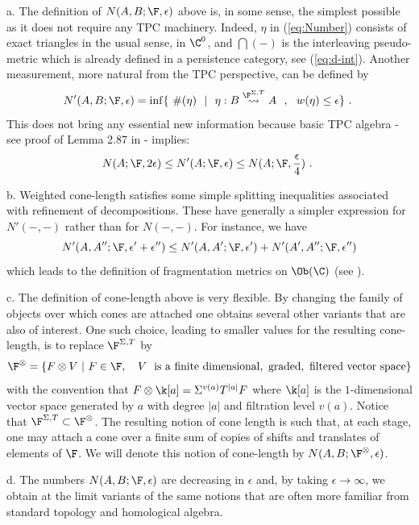\begin{rem}\label{rem:cone-l} a. The definition of
  $N(A,B;\F,\epsilon)$ above is, in some sense, the simplest
  possible as it does not require any TPC machinery. Indeed, $\eta$ in
  (\ref{eq:Number}) consists of exact triangles in the usual sense, in
  $\C^{0}$, and $\dint(-)$ is the interleaving pseudo-metric which is
  already defined in a persistence category, see
  (\ref{eq:d-int}). Another measurement, more natural from the TPC
  perspective, can be defined by
  $$N'(A, B;\F,\epsilon)=\inf\{\ \#(\eta)\ \ | \ \
  \eta:B\stackrel{\F^{\Sigma, T}}{\rightsquigarrow} A\ \ , \ \
  w(\eta)\leq \epsilon \}~.~$$ This does not bring any essential
  new information because basic TPC algebra - see proof of Lemma 2.87
  in \cite{BCZ:tpc} - implies:
  $$N(A;\F,2\epsilon)\leq N'(A;\F,\epsilon)\leq  N(A;\F,\frac{\epsilon}{4})~.~$$

  b. Weighted cone-length satisfies some simple splitting inequalities
  associated with refinement of decompositions. These have
  generally a simpler expression for $N'(-,-)$ rather than for
  $N(-,-)$. For instance, we have
 $$N'(A,A'';\F,\epsilon'+\epsilon'')
 \leq N'(A, A';\F,\epsilon')+N'(A', A'';\F,\epsilon'')$$ which
 leads to the definition of fragmentation metrics on $\Ob (\C)$ (see
 \cite{BCZ:tpc}).

 
 c. The definition of cone-length above is very flexible.  By changing
 the family of objects over which cones are attached one obtains
 several other variants that are also of interest. One such choice,
 leading to smaller values for the resulting cone-length, is to
 replace $\F^{\Sigma, T}$ by
 $$ \F^{\otimes}=\{ F\otimes V \ |
 \ F\in \F, \ \ \ V \ \mathrm{\ is\ a\ finite\ dimensional, \ graded,\
   filtered \ vector\ space} \}$$ with the convention that
 $F\otimes \k[a] = \Sigma^{v(a)}T^{|a|}F$ where $\k[a]$ is the
 $1$-dimensional vector space generated by $a$ with
 degree $|a|$ and filtration level $v(a)$. Notice that
 $\F^{\Sigma, T}\subset \F^{\otimes}$. The resulting notion of cone
 length is such that, at each stage, one may attach a cone over a
 finite sum of copies of shifts and translates of elements of $\F$.
 We will denote this notion of cone-length by
 $N(A, B;\F^{\otimes},\epsilon)$.

 
 d. The numbers $N(A,B;\F,\epsilon)$ are decreasing in
 $\epsilon$ and, by taking $\epsilon \to \infty$, we obtain at
 the limit variants of the same notions that are often more familiar
 from standard topology and homological algebra.
\end{rem}
 
